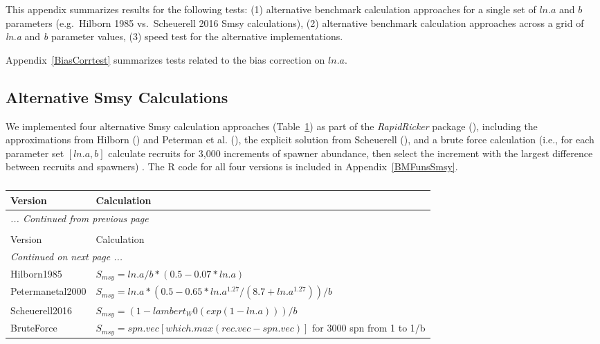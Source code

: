 \documentclass[french,11pt]{book}
\begin{document}
This appendix summarizes results for the following tests: (1) alternative benchmark calculation approaches for a single set of \(ln.a\) and \(b\) parameters (e.g.~Hilborn 1985 vs.~Scheuerell 2016 Smsy calculations), (2) alternative benchmark calculation approaches across a grid of \emph{ln.a} and \emph{b} parameter values, (3) speed test for the alternative implementations.

Appendix~\ref{BiasCorrtest} summarizes tests related to the bias correction on \(ln.a\).

\subsection{Alternative Smsy Calculations}\label{alternative-smsy-calculations}

We implemented four alternative Smsy calculation approaches (Table~\ref{tab:SmsyCalcs}) as part of the \emph{RapidRicker} package (), including the approximations from Hilborn () and Peterman et al. (), the explicit solution from Scheuerell (), and a brute force calculation (i.e., for each parameter set \([ln.a,b]\) calculate recruits for 3,000 increments of spawner abundance, then select the increment with the largest difference between recruits and spawners) . The R code for all four versions is included in Appendix~\ref{BMFunsSmsy}.



\begingroup\fontsize{10}{12}\selectfont \begingroup\fontsize{10}{12}\selectfont  
\begin{longtable}[t]{ll} \caption{\label{tab:SmsyCalcs}\emph{Alternative Smsy Calculation Approaches}.}\\ \toprule Version & Calculation\\ \midrule \endfirsthead \multicolumn{2}{l}{\textit{... Continued from previous page}} \\ \hline \caption*{}\\ \toprule Version & Calculation\\ \midrule \endhead \hline \multicolumn{2}{l}{\textit{Continued on next page ...}} \\ \endfoot \bottomrule \endlastfoot Hilborn1985 & $S_{msy} = ln.a/b * (0.5-0.07 * ln.a)$\\ Petermanetal2000 & $ S_{msy} = ln.a * (0.5 - 0.65 * ln.a^{1.27} / (8.7 + ln.a^{1.27})) / b $\\ Scheuerell2016 & $S_{msy} = (1 - lambert_W0(exp(1 - ln.a))) / b$\\ BruteForce & $S_{msy} = spn.vec[which.max(rec.vec - spn.vec) ]$ for 3000 spn from 1 to 1/b\\* \end{longtable}
\end{document}

